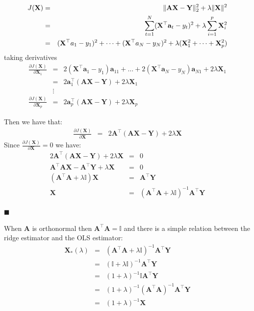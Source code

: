 \begin{eqnarray*}
J(\mathbf{\mathbf{X}}) &=&  \| \mathbf{A}\mathbf{\mathbf{X}} - \mathbf{Y} \|_2^2  + \lambda
 \| \mathbf{\mathbf{X}}\| ^2 \\
 &=&  \sum_{t=1}^N (\mathbf{\mathbf{X}}^\top {\bf a}_t-y_t)^2 + \lambda \sum_{i=1}^p \mathbf{X}_i^2 \\
 &=& (\mathbf{X}^\top a_1-y_1)^2 + \dots + (\mathbf{X}^\top a_N-y_N)^2 + \lambda (\mathbf{X}_1^2+\dots+\mathbf{X}_p^2)
\end{eqnarray*}
\noindent taking derivatives
 \begin{eqnarray*}
 \frac{\partial J(\mathbf{\mathbf{X}})}{\partial \mathbf{X}_1}&=& 
 2(\mathbf{X}^\top \mathbf{a}_1-y_1)\mathbf{a}_{11} + \dots + 2(\mathbf{X}^\top \mathbf{a}_N-y_N)\mathbf{a}_{N1} + 2\lambda \mathbf{X}_1 \\
 &=& 2\mathbf{a}_1^\top(\mathbf{A}\mathbf{X}-\mathbf{Y}) + 2\lambda\mathbf{X}_1\\
& \vdots &\\
  \frac{\partial J(\mathbf{\mathbf{X}})}{\partial \mathbf{X}_p}&=& 
 2\mathbf{a}_p^\top(\mathbf{A}\mathbf{X}-\mathbf{Y}) + 2\lambda\mathbf{X}_p 
\end{eqnarray*}

Then we have that:
\begin{eqnarray*}
\frac{\partial J(\mathbf{\mathbf{X}})}{\partial \mathbf{X}}&=& 
 2\mathbf{A}^\top(\mathbf{A}\mathbf{X}-\mathbf{Y}) + 2\lambda\mathbf{X}
\end{eqnarray*}
Since $\frac{\partial J(\mathbf{\mathbf{X}})}{\partial \mathbf{X}}=0$ we have:
\begin{eqnarray*}
2\mathbf{A}^\top(\mathbf{A}\mathbf{X}-\mathbf{Y}) + 2\lambda\mathbf{X}&=&0 \\
\mathbf{A}^\top\mathbf{A}\mathbf{X} - \mathbf{A}^\top\mathbf{Y} + \lambda\mathbf{X} &=& 0\\
(\mathbf{A}^\top\mathbf{A}+\lambda\mathbb{I})\mathbf{X} &=&  \mathbf{A}^\top\mathbf{Y} \\
\mathbf{X} &=& (\mathbf{A}^\top\mathbf{A}+\lambda\mathbb{I})^{-1}  \mathbf{A}^\top\mathbf{Y}
\end{eqnarray*}

$\blacksquare$

When $\mathbf{A}$ is orthonormal then $\mathbf{A}^\top \mathbf{A} =\mathbb{I}$ and there is a simple relation between the ridge estimator and the OLS estimator:
\begin{eqnarray*}
\mathbf{X}_* (\lambda) &=& (\mathbf{A}^\top \mathbf{A}+\lambda \mathbb{I})^{-1}\mathbf{A}^\top \mathbf{Y} \\
 &=& (\mathbb{I} + \lambda \mathbb{I})^{-1} \mathbf{A}^\top \mathbf{Y} \\
 &=&(1+\lambda)^{-1} \mathbb{I} \mathbf{A}^\top \mathbf{Y} \\
 &=&(1+\lambda)^{-1} (\mathbf{A}^\top \mathbf{A})^{-1}\mathbf{A}^\top \mathbf{Y} \\
 &=&(1+\lambda)^{-1} \mathbf{X}
\end{eqnarray*}

